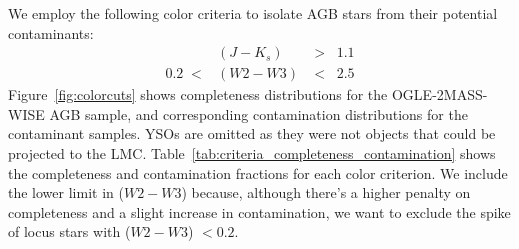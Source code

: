 We employ the following color criteria to isolate AGB stars from their potential contaminants:
\begin{eqnarray}
&(J - K_s) &>\;\;1.1\label{eq:criteria1}\\
0.2\;<&(W2 - W3) &<\;\; 2.5\label{eq:criteria2}
\end{eqnarray}
\noindent Figure~\ref{fig:colorcuts} shows completeness distributions for the OGLE-2MASS-WISE AGB sample, and corresponding contamination distributions for the contaminant samples. YSOs are omitted as they were not objects that could be projected to the LMC. Table~\ref{tab:criteria_completeness_contamination} shows the completeness and contamination fractions for each color criterion. We include the lower limit in ($W2-W3$) because, although there's a higher penalty on completeness and a slight increase in contamination, we want to exclude the spike of locus stars with ($W2-W3$) $< 0.2$.

